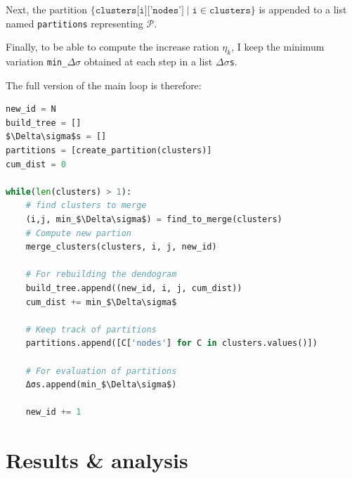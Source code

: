\documentclass[12pt]{article}
\theoremstyle{definition}
\begin{document}
Next, the partition $\{\texttt{clusters[i]['nodes']} \mid \texttt{i} \in \texttt{clusters} \}$ is appended  to a list named \texttt{partitions} representing $\mathcal{P}$.

Finally, to be able to compute the increase ration $\eta_k$, I keep the minimum variation \texttt{min\_$\Delta\sigma$} obtained at each step in a list \texttt{$\Delta\sigma$s}.

The full version of the main loop is therefore:
\begin{lstlisting}[language=Python, mathescape]
new_id = N
build_tree = []
$\Delta\sigma$s = []
partitions = [create_partition(clusters)]
cum_dist = 0

while(len(clusters) > 1):    
    # find clusters to merge
    (i,j, min_$\Delta\sigma$) = find_to_merge(clusters)
    # Compute new partion
    merge_clusters(clusters, i, j, new_id)
    
    # For rebuilding the dendogram
    build_tree.append((new_id, i, j, cum_dist))
    cum_dist += min_$\Delta\sigma$
    
    # Keep track of partitions
    partitions.append([C['nodes'] for C in clusters.values()])
    
    # For evaluation of partitions
    Δσs.append(min_$\Delta\sigma$)
    
    new_id += 1	
\end{lstlisting}

\section{Results \& analysis}
\end{document}
